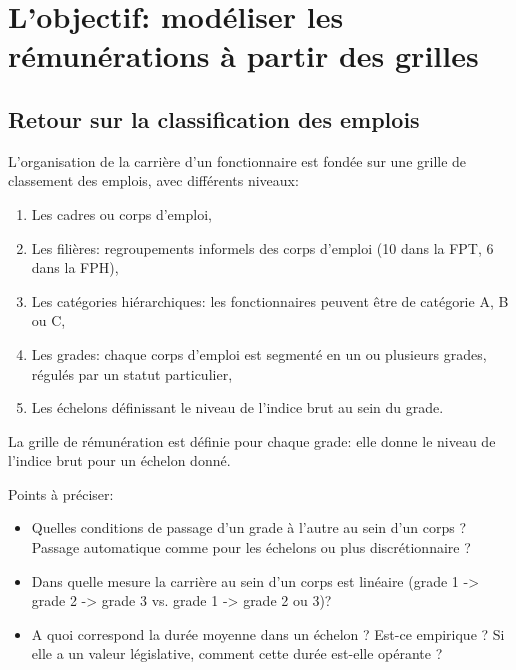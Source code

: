 \documentclass[11pt,a4paper]{article}
\begin{document}
\else \fi



\section{L'objectif: modéliser les rémunérations à partir des grilles}


\subsection*{Retour sur la classification des emplois}

L'organisation de la carrière d'un fonctionnaire est fondée sur une grille de classement des emplois, avec différents niveaux:
 
\begin{enumerate}[leftmargin=1cm ,parsep=0cm,itemsep=0cm,topsep=0cm] 
\item Les cadres ou corps d'emploi,
\item Les filières: regroupements informels des corps d'emploi (10 dans la FPT, 6 dans la FPH), 
\item Les catégories hiérarchiques: les fonctionnaires peuvent être de catégorie A, B ou C,
\item Les grades: chaque corps d'emploi est segmenté en un ou plusieurs grades, régulés par un statut particulier,
\item Les échelons définissant le niveau de l'indice brut au sein du grade. 
\end{enumerate}


\vspace{0.5cm}

La grille de rémunération est définie pour chaque grade: elle donne le niveau de l'indice brut pour un échelon donné. 


Points à préciser: 
\begin{itemize}[leftmargin=1cm ,parsep=0cm,itemsep=0cm,topsep=0cm] 
\item Quelles conditions de passage d'un grade à l'autre au sein d'un corps ? Passage automatique comme pour les échelons ou plus discrétionnaire ? %
\item Dans quelle mesure la carrière au sein d'un corps est linéaire (grade 1 -> grade 2 -> grade 3 vs. grade 1 -> grade 2 ou 3)? 

\item A quoi correspond la durée 
 moyenne dans un échelon ? Est-ce empirique ? Si elle a un valeur législative, comment cette durée est-elle opérante ?
\end{itemize}
\end{document}
